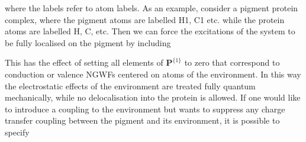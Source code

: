 \documentclass[letterpaper,10pt,english]{sphinxmanual}
\begin{document}
%
\begin{sphinxVerbatim}[commandchars=\\\{\}]
 
      
   
 
\end{sphinxVerbatim}

\begin{DUlineblock}{0em}
\item[] where the labels refer to atom labels. As an example, consider a
 pigment protein complex, where the pigment atoms are labelled H1, C1
 etc. while the protein atoms are labelled H, C, etc. Then we can force
 the excitations of the system to be fully localised on the pigment by
including
\end{DUlineblock}

%
\begin{sphinxVerbatim}[commandchars=\\\{\}]
 
    
 
\end{sphinxVerbatim}

\begin{DUlineblock}{0em}
\item[] This has the effect of setting all elements of
\(\textbf{P}^{\{1\}}\) to zero that correspond to conduction or
valence NGWFs centered on atoms of the environment. In this way the
electrostatic effects of the environment are treated fully quantum
mechanically, while no delocalisation into the protein is allowed. If
one would like to introduce a coupling to the environment but wants to
suppress any charge transfer coupling between the pigment and its
environment, it is possible to specify
\end{DUlineblock}

%
\begin{sphinxVerbatim}[commandchars=\\\{\}]
 
    
    
 
\end{sphinxVerbatim}
\end{document}
